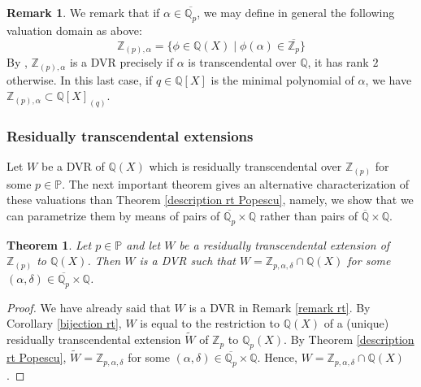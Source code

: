 \documentclass[10pt]{article}
\numberwithin{equation}{section}
\newtheorem{Thm}[equation]{Theorem}
\theoremstyle{definition}
\newtheorem{Rem}[equation]{Remark}
\theoremstyle{definition}
\newcommand{\Q}{\mathbb{Q}}
\newcommand{\Z}{\mathbb{Z}}
\newcommand{\C}{\mathbb{C}}
\newcommand{\PP}{\mathbb{P}}
\newcommand{\oQp}{\overline{\Q_p}}
\newcommand{\wW}{\widetilde{W}}
\newcommand{\oZp}{\overline{\Z_p}}
\newcommand{\br}{\text{br}}
\newcommand\bc { \color{blue}}
\begin{document}
\begin{Rem}\label{why alpha transcendental}
We remark that if $\alpha\in\oQp$, we may define in general the following valuation domain as above:
$$\Z_{(p),\alpha}=\{\phi\in\Q(X)\mid \phi(\alpha)\in \oZp\}$$
By \cite[Proposition 2.2]{PerTransc}, $\Z_{(p),\alpha}$ is a DVR precisely if $\alpha$ is transcendental over $\Q$, it has rank $2$ otherwise. In this last case, if $q\in\Q[X]$ is the minimal polynomial of $\alpha$, we have $\Z_{(p),\alpha}\subset\Q[X]_{(q)}$.
\end{Rem}



\subsubsection{Residually transcendental extensions}




Let $W$ be a DVR of $\Q(X)$ which is residually transcendental over $\Z_{(p)}$ 
for some $p\in\PP$. 
The next important theorem gives an alternative characterization of these valuations than Theorem \ref{description rt Popescu}, 
namely, we show that we can parametrize them by means of pairs of $\oQp\times\Q$ rather than pairs of $\overline{\Q}\times\Q$.   

\begin{Thm}\label{rt over completion}
Let $p\in\PP$ and let $W$ be a residually transcendental extension  of $\Z_{(p)}$ to $\Q(X)$. 
Then $W$ is a DVR such that $W=\Z_{p,\alpha,\delta}\cap\Q(X)$ for some $(\alpha,\delta)\in\oQp\times\Q$.
\end{Thm} 
\begin{proof}
We have already said that $W$ is a DVR in Remark \ref{remark rt}. By Corollary \ref{bijection rt}, $W$ is equal to the restriction to $\Q(X)$ of a (unique) residually transcendental extension $\wW$ of $\Z_p$ to $\Q_p(X)$. By Theorem \ref{description rt Popescu}, $\wW=\Z_{p,\alpha,\delta}$ for some $(\alpha,\delta)\in\oQp\times\Q$. Hence, $W=\Z_{p,\alpha,\delta}\cap\Q(X)$. 
\end{proof}
\end{document}

